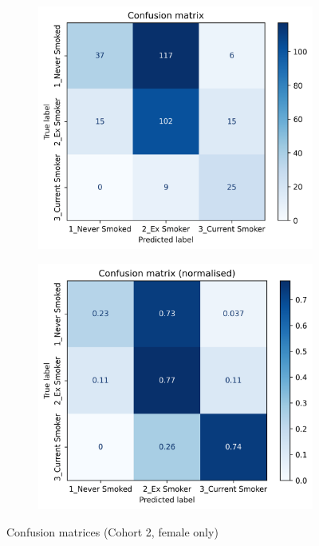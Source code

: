 \documentclass{article} %
\begin{document}
\begin{figure}[p]
    \centering
    \begin{subfigure}{0.45\linewidth}
        \centering
        \includegraphics[width=\linewidth]{cohort2/female_only/test_confusion_matrix.png}
    \end{subfigure}
    \hspace{4mm}
    \begin{subfigure}{0.45\linewidth}
        \centering
        \includegraphics[width=\linewidth]{cohort2/female_only/test_confusion_matrix_normalised.png}
    \end{subfigure}
    \caption[Confusion matrices (Cohort 2, female only)]{Confusion matrices (Cohort 2, female only)}
    \label{fig:female-only-confusion-matrix}
\end{figure}
\end{document}
